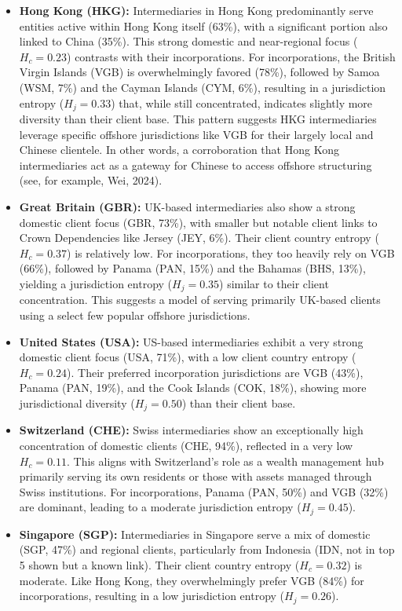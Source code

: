 \begin{itemize}
    \item \textbf{Hong Kong (HKG):} Intermediaries in Hong Kong predominantly serve entities active within Hong Kong itself (63\%), with a significant portion also linked to China (35\%). This strong domestic and near-regional focus ($H_c=0.23$) contrasts with their incorporations. For incorporations, the British Virgin Islands (VGB) is overwhelmingly favored (78\%), followed by Samoa (WSM, 7\%) and the Cayman Islands (CYM, 6\%), resulting in a jurisdiction entropy ($H_j=0.33$) that, while still concentrated, indicates slightly more diversity than their client base. This pattern suggests HKG intermediaries leverage specific offshore jurisdictions like VGB for their largely local and Chinese clientele. In other words, a corroboration that Hong Kong intermediaries act as a gateway for Chinese to access offshore structuring (see, for example, Wei, 2024).

    \item \textbf{Great Britain (GBR):} UK-based intermediaries also show a strong domestic client focus (GBR, 73\%), with smaller but notable client links to Crown Dependencies like Jersey (JEY, 6\%). Their client country entropy ($H_c=0.37$) is relatively low. For incorporations, they too heavily rely on VGB (66\%), followed by Panama (PAN, 15\%) and the Bahamas (BHS, 13\%), yielding a jurisdiction entropy ($H_j=0.35$) similar to their client concentration. This suggests a model of serving primarily UK-based clients using a select few popular offshore jurisdictions.

    \item \textbf{United States (USA):} US-based intermediaries exhibit a very strong domestic client focus (USA, 71\%), with a low client country entropy ($H_c=0.24$). Their preferred incorporation jurisdictions are VGB (43\%), Panama (PAN, 19\%), and the Cook Islands (COK, 18\%), showing more jurisdictional diversity ($H_j=0.50$) than their client base. 

    \item \textbf{Switzerland (CHE):} Swiss intermediaries show an exceptionally high concentration of domestic clients (CHE, 94\%), reflected in a very low $H_c=0.11$. This aligns with Switzerland's role as a wealth management hub primarily serving its own residents or those with assets managed through Swiss institutions. For incorporations, Panama (PAN, 50\%) and VGB (32\%) are dominant, leading to a moderate jurisdiction entropy ($H_j=0.45$).

    \item \textbf{Singapore (SGP):} Intermediaries in Singapore serve a mix of domestic (SGP, 47\%) and regional clients, particularly from Indonesia (IDN, not in top 5 shown but a known link). Their client country entropy ($H_c=0.32$) is moderate. Like Hong Kong, they overwhelmingly prefer VGB (84\%) for incorporations, resulting in a low jurisdiction entropy ($H_j=0.26$).
\end{itemize}

